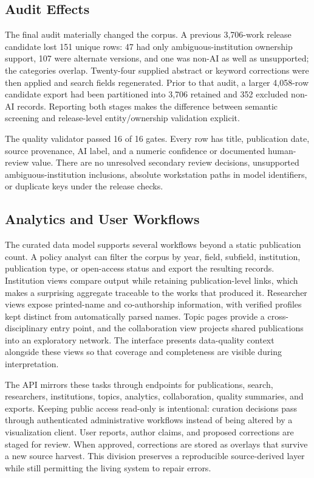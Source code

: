\documentclass[conference]{IEEEtran}
\begin{document}
\subsection{Audit Effects}
The final audit materially changed the corpus. A previous 3,706-work release candidate lost 151 unique rows: 47 had only ambiguous-institution ownership support, 107 were alternate versions, and one was non-AI as well as unsupported; the categories overlap. Twenty-four supplied abstract or keyword corrections were then applied and search fields regenerated. Prior to that audit, a larger 4,058-row candidate export had been partitioned into 3,706 retained and 352 excluded non-AI records. Reporting both stages makes the difference between semantic screening and release-level entity/ownership validation explicit.

The quality validator passed 16 of 16 gates. Every row has title, publication date, source provenance, AI label, and a numeric confidence or documented human-review value. There are no unresolved secondary review decisions, unsupported ambiguous-institution inclusions, absolute workstation paths in model identifiers, or duplicate keys under the release checks.

\subsection{Analytics and User Workflows}
The curated data model supports several workflows beyond a static publication count. A policy analyst can filter the corpus by year, field, subfield, institution, publication type, or open-access status and export the resulting records. Institution views compare output while retaining publication-level links, which makes a surprising aggregate traceable to the works that produced it. Researcher views expose printed-name and co-authorship information, with verified profiles kept distinct from automatically parsed names. Topic pages provide a cross-disciplinary entry point, and the collaboration view projects shared publications into an exploratory network. The interface presents data-quality context alongside these views so that coverage and completeness are visible during interpretation.

The API mirrors these tasks through endpoints for publications, search, researchers, institutions, topics, analytics, collaboration, quality summaries, and exports. Keeping public access read-only is intentional: curation decisions pass through authenticated administrative workflows instead of being altered by a visualization client. User reports, author claims, and proposed corrections are staged for review. When approved, corrections are stored as overlays that survive a new source harvest. This division preserves a reproducible source-derived layer while still permitting the living system to repair errors.
\end{document}
